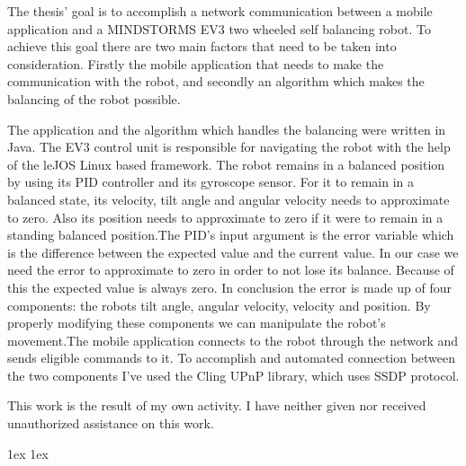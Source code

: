 \documentclass[final]{ubb_dolgozat}
\author{
Márton Zete-Örs
}
\begin{document}
\begin{abstractEN}
	
The thesis’ goal is to accomplish a network communication between a mobile application and a MINDSTORMS EV3 two wheeled self balancing robot. To achieve this goal there are two main factors that need to be taken into consideration. Firstly the mobile application that needs to make the communication with the robot, and secondly an algorithm which makes the balancing of the robot possible.

The application and the algorithm which handles the balancing were written in Java. The EV3 control unit is responsible for navigating the robot with the help of the leJOS Linux based framework. The robot remains in a balanced position by using its PID controller and its gyroscope sensor. For it to remain in a balanced state, its velocity, tilt angle and angular velocity needs to approximate to zero. Also its position needs to approximate to zero if it were to remain in a standing balanced position.The PID’s input argument is the error variable which is the difference between the expected value and the current value. In our case we need the error to approximate to zero in order to not lose its balance. Because of this the expected value is always zero. In conclusion the error is made up of four components: the robots tilt angle, angular velocity, velocity and position. By properly modifying these components we can manipulate the robot’s movement.The mobile application connects to the robot through the network and sends eligible commands to it. To accomplish and automated connection between the two components I’ve used the Cling UPnP library, which uses SSDP protocol.

This work is the result of my own activity. I have neither given nor received unauthorized assistance on this work.

\end{abstractEN}

\maketitle

{ \baselineskip 1ex
  \parskip 1ex
  \tableofcontents
}





%
%
%
\appendix

{ 
	\renewcommand{\baselinestretch}{1.4}\normalsize %
	\setlength{\itemsep}{-2.4mm}
	\setlength{\bibspacing}{0.67\baselineskip}
	
	
}
\end{document}
